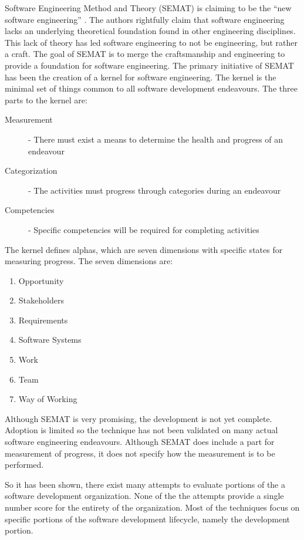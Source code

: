 \documentclass[SDSUThesis.tex]{subfiles}
\begin{document}
    Software Engineering Method and Theory (SEMAT) is claiming to be the ``new software engineering'' 
    \cite{Jacobson2014}.  The authors rightfully claim that software engineering lacks
    an underlying theoretical foundation found in other engineering disciplines.  This lack of theory
    has led software engineering to not be engineering, but rather a craft.  The goal of 
    SEMAT is to merge the craftsmanship and engineering to provide a foundation for software
    engineering.  The primary initiative of SEMAT has been the creation of a kernel for 
    software engineering.  The kernel is the minimal set of things common to all software development
    endeavours. The three parts to the kernel are:
    \begin{description}
        \item[Measurement] - There must exist a means to determine the health and progress of an endeavour
        \item[Categorization]-  The activities must progress through categories during an endeavour
        \item[Competencies] - Specific competencies will be required for completing activities
    \end{description}
    The kernel defines alphas, which are seven dimensions with
    specific states for measuring progress. 
    The seven dimensions are: 
    \begin{enumerate}
        \item Opportunity
        \item Stakeholders
        \item Requirements
        \item Software Systems
        \item Work
        \item Team
        \item Way of Working
    \end{enumerate}
    
    Although SEMAT is very promising, the development is not yet complete.  Adoption is
    limited so the technique has not been validated on many
    actual software engineering endeavours.  Although SEMAT does include a part for
    measurement of progress, it does not specify how the measurement is to be 
    performed.
    
    So it has been shown, there exist many attempts to 
    evaluate portions of the a software development 
    organization.  None of the the attempts provide
    a single number score for the entirety of the 
    organization.  Most of the techniques focus on
    specific portions of the software development 
    lifecycle, namely the development portion. 
    
\end{document}
